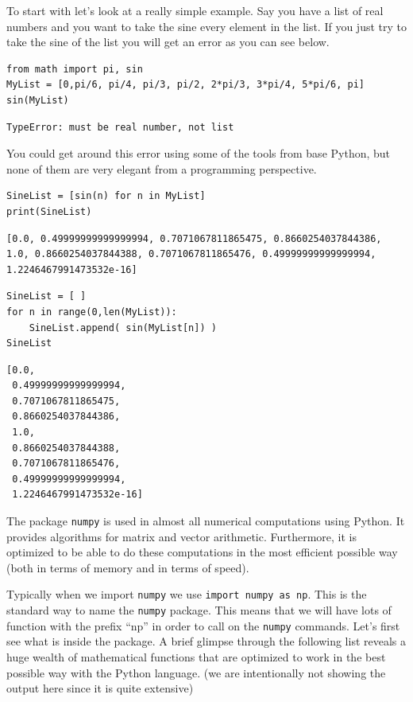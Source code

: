 \begin{example}

To start with let's look at a really simple example.  Say you have a list of real numbers
and you want to take the sine every element in the list.  If you just try to take the sine
of the list you will get an error as you can see below.

\bcode
\begin{lstlisting}
from math import pi, sin
MyList = [0,pi/6, pi/4, pi/3, pi/2, 2*pi/3, 3*pi/4, 5*pi/6, pi]
sin(MyList)
\end{lstlisting}
\boutput
\begin{lstlisting}
TypeError: must be real number, not list
\end{lstlisting}
You could get around this error using some of the tools from base Python, but none of them
are very elegant from a programming perspective.  

\bcode
\begin{lstlisting}
SineList = [sin(n) for n in MyList]
print(SineList)
\end{lstlisting}
\boutput
\begin{lstlisting}
[0.0, 0.49999999999999994, 0.7071067811865475, 0.8660254037844386, 
1.0, 0.8660254037844388, 0.7071067811865476, 0.49999999999999994, 
1.2246467991473532e-16]
\end{lstlisting}

\bcode
\begin{lstlisting}
SineList = [ ]
for n in range(0,len(MyList)):
    SineList.append( sin(MyList[n]) )
SineList
\end{lstlisting}
\boutput
\begin{lstlisting}
[0.0,
 0.49999999999999994,
 0.7071067811865475,
 0.8660254037844386,
 1.0,
 0.8660254037844388,
 0.7071067811865476,
 0.49999999999999994,
 1.2246467991473532e-16]
\end{lstlisting}

\end{example}

The package \texttt{numpy} is used in almost all numerical computations using Python.  It
provides algorithms for matrix and vector arithmetic.  Furthermore, it is optimized to be
able to do these computations in the most efficient possible way (both in terms of memory
and in terms of speed).

Typically when we import \texttt{numpy} we use \texttt{import numpy as np}.  This is the
standard way to name the \texttt{numpy} package.  This means that we will have lots of
function with the prefix ``np'' in order to call on the \texttt{numpy} commands.  Let's
first see what is inside the package.  A brief glimpse through the following list reveals
a huge wealth of mathematical functions that are optimized to work in the best possible
way with the Python language. (we are intentionally not showing the output here since it
is quite extensive)

